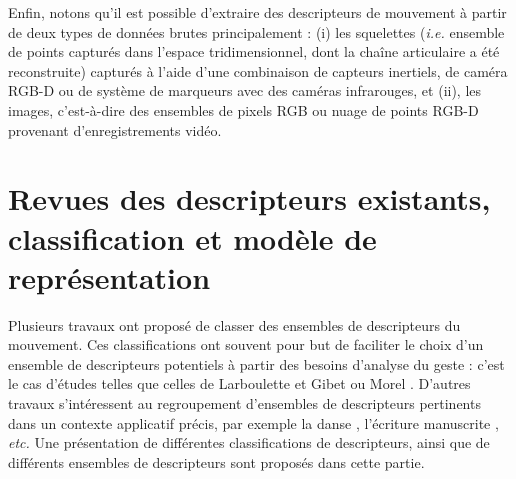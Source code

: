 Enfin, notons qu'il est possible d'extraire des descripteurs de mouvement à partir de deux types de données brutes principalement : (i) les squelettes (\textit{i.e.} ensemble de points capturés dans l'espace tridimensionnel, dont la chaîne articulaire a été reconstruite) capturés à l'aide d'une combinaison de capteurs inertiels, de caméra RGB-D ou de système de marqueurs avec des caméras infrarouges, et (ii), les images, c'est-à-dire des ensembles de pixels RGB ou nuage de points RGB-D provenant d'enregistrements vidéo. %

\section{Revues des descripteurs existants, classification et modèle de représentation}
Plusieurs travaux ont proposé de classer des ensembles de descripteurs du mouvement. Ces classifications ont souvent pour but de faciliter le choix d'un ensemble de descripteurs potentiels à partir des besoins d'analyse du geste : c'est le cas d'études telles que celles de Larboulette et Gibet \parencite{larboulette2015Descriptors} ou Morel \parencite{Morel2017Mts}. D'autres travaux s'intéressent au regroupement d'ensembles de descripteurs pertinents dans un contexte applicatif précis, par exemple la danse \parencite{Bouchard2007SSo}, l'écriture manuscrite \parencite{Delaye2013HBF}, \textit{etc.} Une présentation de différentes classifications de descripteurs, ainsi que de différents ensembles de descripteurs sont proposés dans cette partie.

